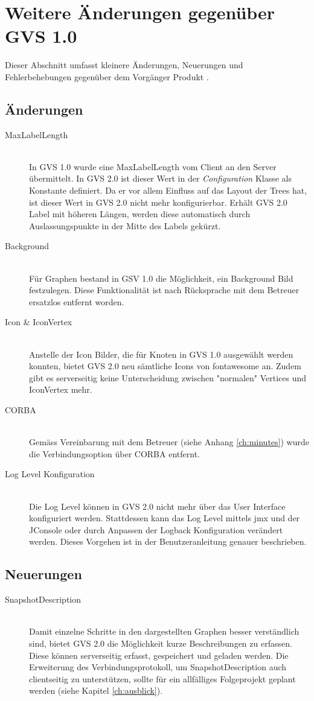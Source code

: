 \documentclass[11pt,a4paper,english,oneside]{book}
\numberwithin{equation}{chapter}
\begin{document}
	\section{Weitere Änderungen gegenüber GVS 1.0}
	Dieser Abschnitt umfasst kleinere Änderungen, Neuerungen und Fehlerbehebungen gegenüber dem Vorgänger Produkt \cite{gvs1}. 
	
	\subsection{Änderungen}
	\begin{description}
		\item[MaxLabelLength] \hfill \\
		In GVS 1.0 wurde eine MaxLabelLength vom Client an den Server übermittelt. In GVS 2.0 ist dieser Wert in der \textit{Configuration} Klasse als Konstante definiert. Da er vor allem Einfluss auf das Layout der Trees hat, ist dieser Wert in GVS 2.0 nicht mehr konfigurierbar. Erhält GVS 2.0 Label mit höheren Längen, werden diese automatisch durch Auslassungspunkte in der Mitte des Labels gekürzt.
		\item[Background] \hfill \\ 
		Für Graphen bestand in GSV 1.0 die Möglichkeit, ein Background Bild festzulegen. Diese Funktionalität ist nach Rücksprache mit dem Betreuer ersatzlos entfernt worden.
		\item[Icon \& IconVertex] \hfill \\
		Anstelle der Icon Bilder, die für Knoten in GVS 1.0 ausgewählt werden konnten, bietet GVS 2.0 neu sämtliche Icons von \gls{fontawesome} \cite{fontawesome} an. Zudem gibt es serverseitig keine Unterscheidung zwischen "normalen" Vertices und IconVertex mehr.
		\item[CORBA] \hfill \\
		Gemäss Vereinbarung mit dem Betreuer (siehe Anhang \ref{ch:minutes}) wurde die Verbindungsoption über CORBA entfernt.
		\item[Log Level Konfiguration] \hfill \\
		Die Log Level können in GVS 2.0 nicht mehr über das User Interface konfiguriert werden. Stattdessen kann das Log Level mittels \gls{jmx} und der JConsole oder durch Anpassen der Logback Konfiguration verändert werden. Dieses Vorgehen ist in der Benutzeranleitung genauer beschrieben.
	\end{description}

	\subsection{Neuerungen}
	\begin{description}
		\item[SnapshotDescription] \hfill \\ Damit einzelne Schritte in den dargestellten Graphen besser verständlich sind, bietet GVS 2.0 die Möglichkeit kurze Beschreibungen zu erfassen. Diese können serverseitig erfasst, gespeichert und geladen werden. Die Erweiterung des Verbindungsprotokoll, um SnapshotDescription auch clientseitig zu unterstützen, sollte für ein allfälliges Folgeprojekt geplant werden (siehe Kapitel \ref{ch:ausblick}).
	\end{description}
	
\end{document}
